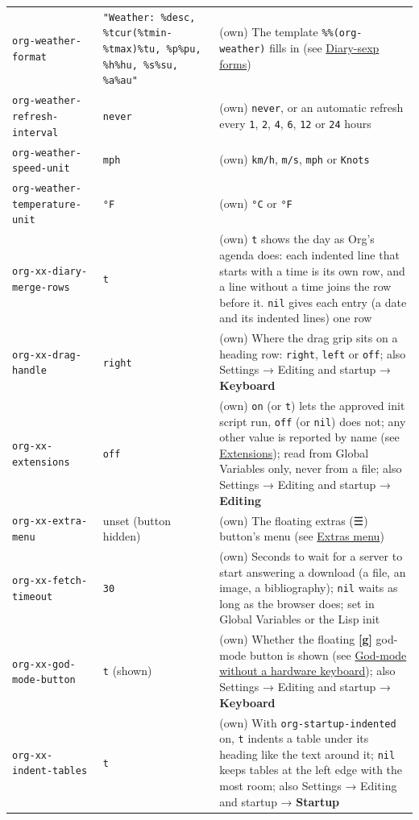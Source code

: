 \documentclass[11pt]{article}
\begin{document}
\begin{center}
\begin{tabular}{lll}
\texttt{org-weather-format} & \texttt{"Weather: \%desc, \%tcur(\%tmin-\%tmax)\%tu, \%p\%pu, \%h\%hu, \%s\%su, \%a\%au"} & (own) The template \texttt{\%\%(org-weather)} fills in (see \hyperref[sec:org0188e97]{Diary-sexp forms})\\[0pt]
\texttt{org-weather-refresh-interval} & \texttt{never} & (own) \texttt{never}, or an automatic refresh every \texttt{1}, \texttt{2}, \texttt{4}, \texttt{6}, \texttt{12} or \texttt{24} hours\\[0pt]
\texttt{org-weather-speed-unit} & \texttt{mph} & (own) \texttt{km/h}, \texttt{m/s}, \texttt{mph} or \texttt{Knots}\\[0pt]
\texttt{org-weather-temperature-unit} & \texttt{°F} & (own) \texttt{°C} or \texttt{°F}\\[0pt]
\texttt{org-xx-diary-merge-rows} & \texttt{t} & (own) \texttt{t} shows the day as Org's agenda does: each indented line that starts with a time is its own row, and a line without a time joins the row before it. \texttt{nil} gives each entry (a date and its indented lines) one row\\[0pt]
\texttt{org-xx-drag-handle} & \texttt{right} & (own) Where the drag grip sits on a heading row: \texttt{right}, \texttt{left} or \texttt{off}; also Settings → Editing and startup → \textbf{Keyboard}\\[0pt]
\texttt{org-xx-extensions} & \texttt{off} & (own) \texttt{on} (or \texttt{t}) lets the approved init script run, \texttt{off} (or \texttt{nil}) does not; any other value is reported by name (see \hyperref[sec:orgd63a52b]{Extensions}); read from Global Variables only, never from a file; also Settings → Editing and startup → \textbf{Editing}\\[0pt]
\texttt{org-xx-extra-menu} & unset (button hidden) & (own) The floating extras (☰) button's menu (see \hyperref[sec:org147f9a0]{Extras menu})\\[0pt]
\texttt{org-xx-fetch-timeout} & \texttt{30} & (own) Seconds to wait for a server to start answering a download (a file, an image, a bibliography); \texttt{nil} waits as long as the browser does; set in Global Variables or the Lisp init\\[0pt]
\texttt{org-xx-god-mode-button} & \texttt{t} (shown) & (own) Whether the floating \textbf{[g]} god-mode button is shown (see \hyperref[sec:org6e28df8]{God-mode without a hardware keyboard}); also Settings → Editing and startup → \textbf{Keyboard}\\[0pt]
\texttt{org-xx-indent-tables} & \texttt{t} & (own) With \texttt{org-startup-indented} on, \texttt{t} indents a table under its heading like the text around it; \texttt{nil} keeps tables at the left edge with the most room; also Settings → Editing and startup → \textbf{Startup}\\[0pt]

\end{tabular}
\end{center}
\end{document}
